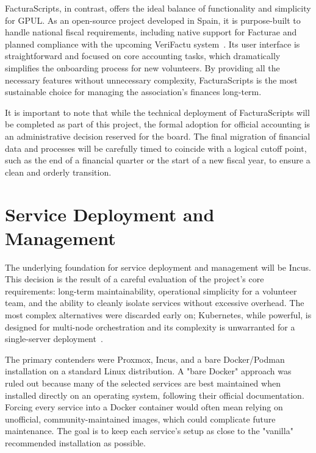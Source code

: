 FacturaScripts, in contrast, offers the ideal balance of functionality and simplicity for GPUL. As an open-source project developed in Spain, it is purpose-built to handle national fiscal requirements, including native support for Facturae and planned compliance with the upcoming VeriFactu system~\cite{facturascripts-antifraude}. Its user interface is straightforward and focused on core accounting tasks, which dramatically simplifies the onboarding process for new volunteers. By providing all the necessary features without unnecessary complexity, FacturaScripts is the most sustainable choice for managing the association's finances long-term.

It is important to note that while the technical deployment of FacturaScripts will be completed as part of this project, the formal adoption for official accounting is an administrative decision reserved for the board. The final migration of financial data and processes will be carefully timed to coincide with a logical cutoff point, such as the end of a financial quarter or the start of a new fiscal year, to ensure a clean and orderly transition.

\section{Service Deployment and Management}

The underlying foundation for service deployment and management will be Incus. This decision is the result of a careful evaluation of the project's core requirements: long-term maintainability, operational simplicity for a volunteer team, and the ability to cleanly isolate services without excessive overhead. The most complex alternatives were discarded early on; Kubernetes, while powerful, is designed for multi-node orchestration and its complexity is unwarranted for a single-server deployment~\cite{kubernetes-docs-2025}.

The primary contenders were Proxmox, Incus, and a bare Docker/Podman installation on a standard Linux distribution. A "bare Docker" approach was ruled out because many of the selected services are best maintained when installed directly on an operating system, following their official documentation. Forcing every service into a Docker container would often mean relying on unofficial, community-maintained images, which could complicate future maintenance. The goal is to keep each service's setup as close to the "vanilla" recommended installation as possible.

